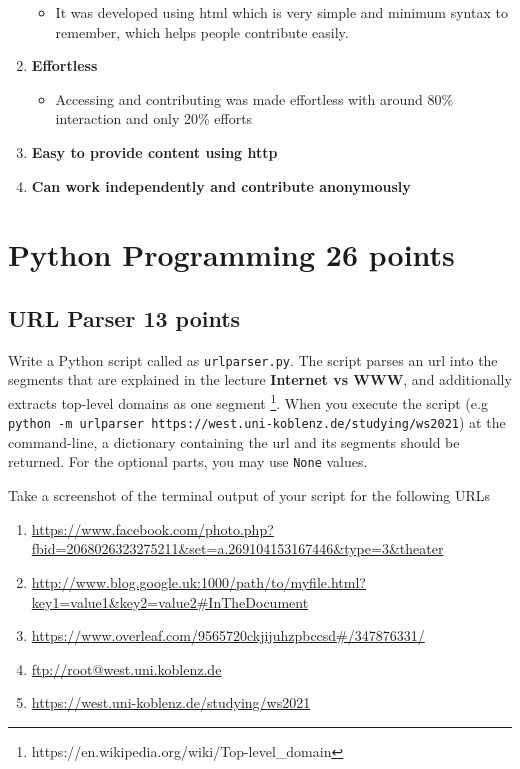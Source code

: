 \documentclass{resources/WeSTassignment}
\begin{document}
\begin{enumerate}
	\begin{itemize}
    		\item It was developed using html which is very simple and minimum syntax to remember, which helps people contribute easily.
	\end{itemize}
    \item \textbf{Effortless}
	\begin{itemize}
    		\item Accessing and contributing was made effortless with around 80\% interaction and only 20\% efforts
	\end{itemize}
    \item \textbf{Easy to provide content using http}
    \item \textbf{Can work independently and contribute anonymously}
\end{enumerate}


\section{Python Programming \hfill{26 points}}
\subsection{URL Parser \hfill{13 points}\label{url_parser}}
Write a Python script called as \texttt{urlparser.py}. The script parses an url into the segments that are explained in the lecture \textbf{Internet vs WWW}, and additionally extracts top-level domains as one segment \footnote{https://en.wikipedia.org/wiki/Top-level\_domain}. When you execute the script (e.g \texttt{python -m urlparser https://west.uni-koblenz.de/studying/ws2021}) at the command-line, a dictionary containing the url and its segments should be returned. For the optional parts, you may use \texttt{None} values. 

Take a screenshot of the terminal output of your script for the following URLs
\begin{enumerate}
    \item \url{https://www.facebook.com/photo.php?fbid=2068026323275211&set=a.269104153167446&type=3&theater}
    \item \url{http://www.blog.google.uk:1000/path/to/myfile.html?key1=value1&key2=value2#InTheDocument}
    \item \url{https://www.overleaf.com/9565720ckjijuhzpbccsd#/347876331/}
    \item \url{ftp://root@west.uni.koblenz.de}
    \item \url{https://west.uni-koblenz.de/studying/ws2021}
    
\end{enumerate}
\end{document}
